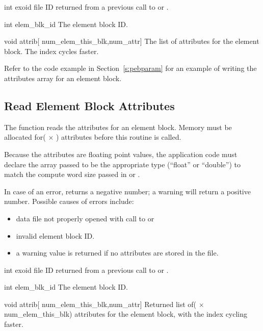 
\begin{parameters}
\item[{int exoid \R{}}]
\exo{} file ID returned from a previous call to  
or .

\item[{int elem_blk_id \R{}}]
The element block ID.

\item[{void attrib}{[} {num_elem_this_blk,num_attr}{]} {\R{}}]
The list of attributes for the element block. The 
index cycles faster.
\end{parameters}

Refer to the code example in Section~\ref{s:pebparam} for an example
of writing the attributes array for an element block.


\subsection{Read Element Block Attributes}

The function  reads the attributes for an
element block. Memory must be allocated for( $\times$
) attributes before this routine is called.

Because the attributes are floating point values, the application code
must declare the array passed to be the appropriate type (``float'' or
``double'') to match the compute word size passed in
 or .

In case of an error,  returns a 
negative number; a warning will return a positive number. 
Possible causes of errors include:

\begin{itemize}
 \item data file not properly opened with call to 
 or 

 \item invalid element block ID.

 \item a warning value is returned if no attributes are stored in the
 file.
\end{itemize}



\begin{parameters}
\item[{int exoid \R{}}]
\exo{} file ID returned from a previous call to  
or .

\item[{int elem_blk_id \R{}}]
The element block ID.

\item[{void attrib}{[} {num_elem_this_blk,num_attr}{]} {\W{}}]
Returned list of( $\times$ {num_elem_this_blk}) attributes for
the element block, with the  index cycling faster.
\end{parameters}

